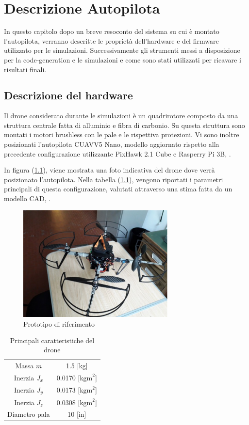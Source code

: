 \chapter{Descrizione Autopilota}
In questo capitolo dopo un breve resoconto del sistema su cui è montato l'autopilota, verranno descritte le proprietà dell'hardware e del firmware utilizzato per le simulazioni. Successivamente gli strumenti messi a disposizione per la code-generation e le simulazioni e come sono stati utilizzati per ricavare i risultati finali.

\section{Descrizione del hardware}

Il drone considerato durante le simulazioni è un quadrirotore composto da una struttura centrale fatta di alluminio e fibra di carbonio. Su questa struttura sono montati i motori brushless con le pale e le rispettiva protezioni. Vi sono inoltre posizionati l'autopilota CUAV\textregistered V5 Nano\textregistered, modello aggiornato rispetto alla precedente configurazione utilizzante PixHawk 2.1 Cube e Rasperry Pi 3B, \cite{DesTestCarm}.

In figura (\ref{fig:DRONE}), viene mostrata una foto indicativa del drone dove verrà posizionato l'autopilota. Nella tabella (\ref{tab:DRONE}), vengono riportati i parametri principali di questa configurazione, valutati attraverso una stima fatta da un modello CAD, \cite{DesTestCarm}.

\begin{figure}
	\centering
	\includegraphics[width=0.7\textwidth]{DescrizioneAutopilota/Figure/DRONE}
	\caption{Prototipo di riferimento}
	\label{fig:DRONE}
\end{figure}

\begin{table}
	\centering
	\begin{tabular}{c c}
		\hline
		Massa $m$ & 1.5 [kg] \\
		Inerzia $J_x$ & 0.0170 [$\text{kgm}^2$] \\
		Inerzia $J_y$ & 0.0173 [$\text{kgm}^2$] \\
		Inerzia $J_z$ & 0.0308 [$\text{kgm}^2$] \\
		Diametro pala & 10 [in]\\
		\hline
	\end{tabular}	
	\caption{Principali caratteristiche del drone}
	\label{tab:DRONE}
\end{table}

